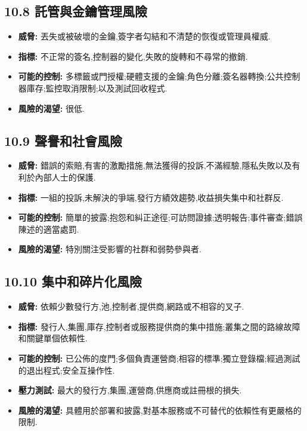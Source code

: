 \documentclass[11pt]{article}
\begin{document}
\subsection*{10.8 託管與金鑰管理風險}

\begin{itemize}[leftmargin=*]
\item \textbf{威脅:} 丟失或被破壞的金鑰,簽字者勾結和不清楚的恢復或管理員權威.
\item \textbf{指標:} 不正常的簽名,控制器的變化,失敗的旋轉和不尋常的撤銷.
\item \textbf{可能的控制:} 多標籤或門授權;硬體支援的金鑰;角色分離;簽名器轉換;公共控制器庫存;監控取消限制;以及測試回收程式.
\item \textbf{風險的渴望:} 很低.
\end{itemize}
\subsection*{10.9 聲譽和社會風險}

\begin{itemize}[leftmargin=*]
\item \textbf{威脅:} 錯誤的索賠,有害的激勵措施,無法獲得的投訴,不滿經驗,隱私失敗以及有利於內部人士的保護.
\item \textbf{指標:} 一組的投訴,未解決的爭端,發行方績效趨勢,收益損失集中和社群反.
\item \textbf{可能的控制:} 簡單的披露;抱怨和糾正途徑;可訪問證據;透明報告;事件審查;錯誤陳述的適當處罰.
\item \textbf{風險的渴望:} 特別關注受影響的社群和弱勢參與者.
\end{itemize}
\subsection*{10.10 集中和碎片化風險}

\begin{itemize}[leftmargin=*]
\item \textbf{威脅:} 依賴少數發行方,池,控制者,提供商,網路或不相容的叉子.
\item \textbf{指標:} 發行人,集團,庫存,控制者或服務提供商的集中措施;叢集之間的路線故障和關鍵單個依賴性.
\item \textbf{可能的控制:} 已公佈的度門;多個負責運營商;相容的標準;獨立登錄檔;經過測試的退出程式;安全互操作性.
\item \textbf{壓力測試:} 最大的發行方,集團,運營商,供應商或註冊根的損失.
\item \textbf{風險的渴望:} 具體用於部署和披露,對基本服務或不可替代的依賴性有更嚴格的限制.
\end{itemize}
\end{document}

